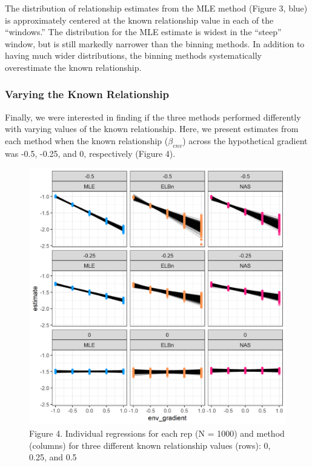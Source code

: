 \documentclass[
]{article}
\begin{document}
The distribution of relationship estimates from the MLE method (Figure
3, blue) is approximately centered at the known relationship value in
each of the ``windows.'' The distribution for the MLE estimate is widest
in the ``steep'' window, but is still markedly narrower than the binning
methods. In addition to having much wider distributions, the binning
methods systematically overestimate the known relationship.

\hypertarget{varying-the-known-relationship}{%
\subsubsection{Varying the Known
Relationship}\label{varying-the-known-relationship}}

Finally, we were interested in finding if the three methods performed
differently with varying values of the known relationship. Here, we
present estimates from each method when the known relationship
(\(\beta_{env}\)) across the hypothetical gradient was -0.5, -0.25, and
0, respectively (Figure 4).

\begin{figure}
\centering
\includegraphics{figures/vary_beta_plot.png}
\caption{Figure 4. Individual regressions for each rep (N = 1000) and
method (columns) for three different known relationship values (rows):
0, 0.25, and 0.5}
\end{figure}
\end{document}
